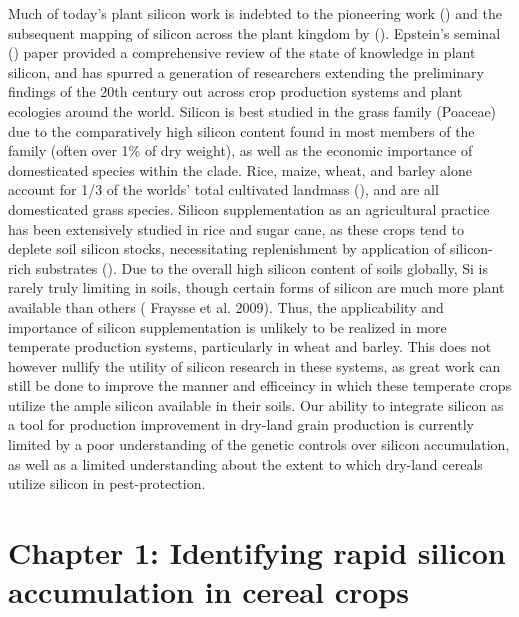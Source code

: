\documentclass[12pt, letterpaper, ]{article}
\begin{document}
Much of today’s plant silicon work is indebted to the pioneering work (\cite{jones_silica_1967}) and the subsequent mapping of silicon across the plant kingdom by (\cite{takahashi_possibility_1990}). Epstein’s seminal (\cite{epstein_silicon_1999}) paper provided a comprehensive review of the state of knowledge in plant silicon, and has spurred a generation of researchers extending the preliminary findings of the 20th century out across crop production systems and plant ecologies around the world. Silicon is best studied in the grass family (Poaceae) due to the comparatively high silicon content found in most members of the family (often over 1\% of dry weight), as well as the economic importance of domesticated species within the clade. Rice, maize, wheat, and barley alone account for 1/3 of the worlds’ total cultivated landmass (\cite{faostat}), and are all domesticated grass species. Silicon supplementation as an agricultural practice has been extensively studied in rice and sugar cane, as these crops tend to deplete soil silicon stocks, necessitating replenishment by application of silicon-rich substrates (\cite{haynes_contemporary_2014,meena_case_2014}). Due to the overall high silicon content of soils globally, Si is rarely truly limiting in soils, though certain forms of silicon are much more plant available than others (\cite{} Fraysse et al. 2009). Thus, the applicability and importance of silicon supplementation is unlikely to be realized in more temperate production systems, particularly in wheat and barley. This does not however nullify the utility of silicon research in these systems, as great work can still be done to improve the manner and efficeincy in which these temperate crops utilize the ample silicon available in their soils. Our ability to integrate silicon as a tool for production improvement in dry-land grain production is currently limited by a poor understanding of the genetic controls over silicon accumulation, as well as a limited understanding about the extent to which dry-land cereals utilize silicon in pest-protection. 

\section{Chapter 1: Identifying rapid silicon accumulation in cereal crops}
\end{document}
